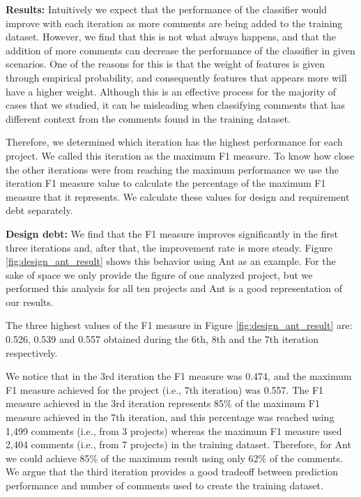 \vspace{1mm}
\noindent \textbf{Results:} Intuitively we expect that the performance of the classifier would improve with each iteration as more comments are being added to the training dataset. However, we find that this is not what always happens, and that the addition of more comments can decrease the performance of the classifier in given scenarios. One of the reasons for this is that the weight of features is given through empirical probability, and consequently features that appears more will have a higher weight. Although this is an effective process for the majority of cases that we studied, it can be misleading when classifying comments that has different context from the comments found in the training dataset. 

Therefore, we determined which iteration has the highest performance for each project. We called this iteration as the maximum F1 measure. To know how close the other iterations were from reaching the maximum performance we use the iteration F1 measure value to calculate the percentage of the maximum F1 measure that it represents. We calculate these values for design and requirement debt separately.

\vspace{1mm}
\noindent \textbf{Design debt:} We find that the F1 measure improves significantly in the first three iterations and, after that, the improvement rate is more steady. Figure \ref{fig:design_ant_result} shows this behavior using Ant as an example. For the sake of space we only provide the figure of one analyzed project, but we performed this analysis for all ten projects and Ant is a good representation of our results. 

The three highest values of the F1 measure in Figure \ref{fig:design_ant_result} are: 0.526, 0.539 and 0.557 obtained during the 6th, 8th and the 7th iteration respectively.

We notice that in the 3rd iteration the F1 measure was 0.474, and the maximum F1 measure achieved for the project (i.e., 7th iteration) was 0.557. The F1 measure achieved in the 3rd iteration represents 85\% of the maximum F1 measure achieved in the 7th iteration, and this percentage was reached using 1,499 comments (i.e., from 3 projects) whereas the maximum F1 measure used 2,404 comments (i.e., from 7 projects) in the training dataset. Therefore, for Ant we could achieve 85\% of the maximum result using only 62\% of the comments. We argue that the third iteration provides a good tradeoff between prediction performance and number of comments used to create the training dataset.

